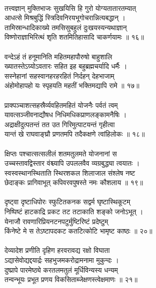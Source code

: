 \\
तत्त्वज्ञान् मुक्तिभाजः सुखयिसि हि गुरो योग्यतातारतम्यात्\\
     आधत्से मिश्रबुद्धिं स्त्रिदिवनिरयभूगोचरान्नित्यबद्धान् ।\\
तामिस्रान्धादिकाख्ये  तमसिसुबहुलं दुःखयस्यन्यथाज्ञान्\\
     विष्णोराज्ञाभिरित्थं श‍ृति शतमितिहासादि चाकर्णयामः ॥ १६॥\\
\\
वन्देऽहं तं हनूमानिति महितमहापौरुषो बाहुशालि\\
     ख्यातस्तेऽग्र्योऽवतारः सहित इह बहुब्रह्मचर्यादि धर्मैः ।\\
सस्नेहानां सहस्वानहरहरहितं निर्दहन् देहभाजाम्\\
     अंहोमोहापहो यः स्पृहयति महतीं भक्तिमद्यापि रामे ॥ १७॥\\
\\
प्राक्पञ्चाशत्सहस्रैर्व्यवहितमहितं योजनैः पर्वतं त्वम्\\
     यावत्सञ्जीवनाद्यौषध निधिमधिकप्राणलङ्कामनैषिः ।\\
अद्राक्षीदुत्पतन्तं तत उत गिरिमुत्पाटयन्तं गृहीत्वा\\
     यान्तं खे राघवाङ्घ्रौ प्रणतमपि तदैकक्षणे त्वांहिलोकः ॥ १८॥\\
\\
क्षिप्तः पश्चात्सत्सलीलं शतमतुलमते योजनानां स\\
     उच्चस्तावद्विस्तार वंश्च्यापि उपललवैव व्यग्रबुद्ध्या त्वयातः ।\\
स्वस्वस्थानस्थिताति स्थिरशकल शिलाजाल संश्लेष नष्ट\\
     छेदाङ्कः प्रागिवाभूत् कपिवरवपुषस्ते नमः कौशलाय ॥ १९॥\\
\\
दृष्ट्वा दृष्टाधिपोरः स्फुटितकनक सद्वर्म घृष्टास्थिकूटम्\\
     निष्पिष्टं हाटकाद्रि प्रकट तट तटाकाति शङ्को जनोऽभूत् ।\\
येनाजौ रावणारिप्रियनटनपटुर्मुष्टिरिष्टं प्रदेष्टुम्\\
     किंनेष्टे मे स तेऽष्टापदकट कतटित्कोटि भामृष्ट काष्ठः ॥ २०॥\\
\\
देव्यादेश प्रणीति दृहिण हरवरावद्य रक्षो विघाता\\
     ऽद्यासेवोद्यद्दयार्द्रः सहभुजमकरोद्रामनामा मुकुन्दः ।\\
दुष्प्रापे पारमेष्ठ्ये करतलमतुलं मूर्धिविन्यस्य धन्यम्\\
     तन्वन्भूयः प्रभूत प्रणय विकसिताब्जेक्षणस्त्वेक्षमाणः ॥ २१॥\\
